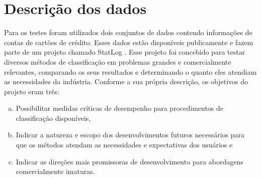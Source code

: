 \section{Descrição dos dados}

Para os testes foram utilizados dois conjuntos de dados contendo informações de contas de cartões de crédito. Esses dados estão disponíveis publicamente e fazem parte de um projeto chamado StatLog \cite{Michie1994}. Esse projeto foi concebido para testar diversos métodos de classificação em problemas grandes e comercialmente relevantes, comparando os seus resultados e determinando o quanto eles atendiam as necessidades da indústria. Conforme a sua própria descrição, os objetivos do projeto eram três:

\begin{enumerate}[a)]
    \item Possibilitar medidas críticas de desempenho para procedimentos de classificação disponíveis,
    \item Indicar a natureza e escopo dos desenvolvimentos futuros necessários para que os métodos atendam as necessidades e expectativas dos usuários e
    \item Indicar as direções mais promissoras de desenvolvimento para abordagens comercialmente imaturas.
\end{enumerate}


